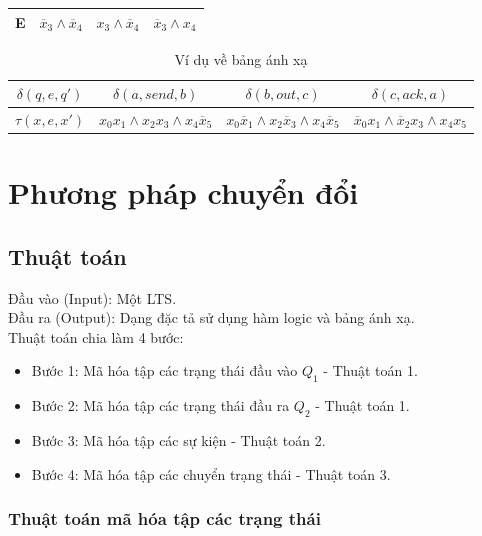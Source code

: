 \documentclass[a4paper,13pt,oneside,openany]{book}
\newenvironment{megaalgorithm}[1][htb]
{\renewcommand{\algorithmcfname}{Thuật toán}%
	\begin{algorithm}[#1]%
}{\end{algorithm}}
\begin{document}
\begin{flushleft}
\begin{table}[!ht]
\begin{tabular}{|c|c|c|c|}
				\hline
				E & $\overline{x}_3 \land \overline{x}_4$ & $x_3\land \overline{x}_4$ & $\overline{x}_3\land x_4$ \\
				\hline
			\end{tabular}
		\end{table}
		\begin{table}[!ht]
			\centering
			\renewcommand{\arraystretch}{1.25}
			\begin{tabular}{|c|c|c|c|}
				\hline
				$\delta(q, e, q')$ & $\delta(a, send, b)$ & $\delta(b, out, c)$ & $\delta(c, ack, a)$\\
				\hline
				$\tau(x, e, x')$ & $x_0x_1 \land x_2x_3 \land x_4\overline x_5$ & $x_0\overline x_1 \land x_2 \overline x_3 \land x_4 \overline x_5$ & $\overline x_0 x_1 \land \overline x_2 x_3 \land x_4x_5$ \\
				\hline
			\end{tabular}
			\caption{Ví dụ về bảng ánh xạ}
		\end{table}
	\chapter{Phương pháp chuyển đổi}				
		\section{Thuật toán}
		Đầu vào (Input): Một LTS.\\
		Đầu ra (Output): Dạng đặc tả sử dụng hàm logic và bảng ánh xạ.\\
		Thuật toán chia làm 4 bước:
		
		\begin{itemize}
			\item Bước 1: Mã hóa tập các trạng thái đầu vào $Q_1$ - Thuật toán 1.
			\item Bước 2: Mã hóa tập các trạng thái đầu ra $Q_2$ - Thuật toán 1.
			\item Bước 3: Mã hóa tập các sự kiện - Thuật toán 2.
			\item Bước 4: Mã hóa tập các chuyển trạng thái - Thuật toán 3.
		\end{itemize}
		
		\subsection{Thuật toán mã hóa tập các trạng thái}
		\begin{megaalgorithm}[H]
			\SetAlgoLined
			\DontPrintSemicolon
				

\end{megaalgorithm}
\end{flushleft}
\end{document}
